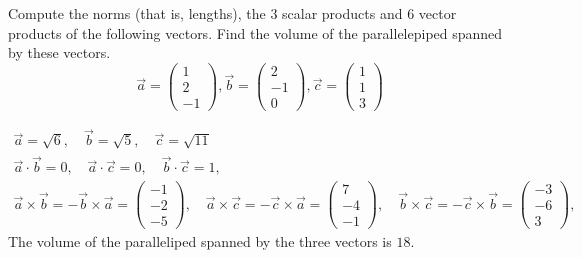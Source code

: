 \documentclass[11pt]{article}
\begin{document}


\begin{exercise}
	Compute the norms (that is, lengths), the $3$ scalar products and $6$ vector products of the following vectors. 
    Find the volume of the parallelepiped spanned by these vectors.
    \[
    \vec{a} = \left(\begin{array}{c} 1 \\ 2 \\ -1 \end{array}\right)
    ,
    \vec{b} = \left(\begin{array}{c} 2 \\ -1 \\ 0 \end{array}\right)
    ,
    \vec{c} = \left(\begin{array}{c} 1 \\ 1 \\ 3 \end{array}\right)
    \]
\end{exercise}

\begin{solution}
    \begin{gather*}
        \vec{a} = \sqrt{6}, \quad \vec{b} = \sqrt{5}, \quad \vec{c} = \sqrt{11}
        \\
        \vec{a} \cdot \vec{b} = 0,
        \quad 
        \vec{a} \cdot \vec{c} = 0,
        \quad 
        \vec{b} \cdot \vec{c} = 1,
        \\ 
        \vec{a} \times \vec{b} = - \vec{b} \times \vec{a} = \left(\begin{array}{c} -1 \\ -2 \\ -5 \end{array}\right),
        \quad 
        \vec{a} \times \vec{c} = - \vec{c} \times \vec{a} = \left(\begin{array}{c} 7 \\ -4 \\ -1 \end{array}\right),
        \quad 
        \vec{b} \times \vec{c} = - \vec{c} \times \vec{b} = \left(\begin{array}{c} -3 \\ -6 \\ 3 \end{array}\right),
    \end{gather*}
    The volume of the paralleliped spanned by the three vectors is $18$.
    
    
\end{solution}
\end{document}
